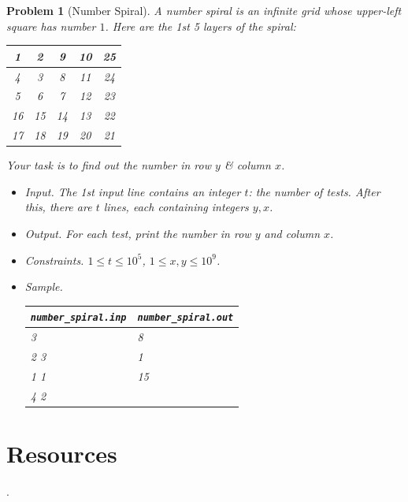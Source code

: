 \documentclass{article}
\newtheorem{problem}{Problem}
\begin{document}
\begin{problem}[Number Spiral]
	A \emph{number spiral} is an infinite grid whose upper-left square has number $1$. Here are the 1st 5 layers of the spiral:
	\begin{table}[H]
		\centering
		\begin{tabular}{|c|c|c|c|c|}
			\hline
			1 & 2 & 9 & 10 & 25 \\
			\hline
			4 & 3 & 8 & 11 & 24 \\
			\hline
			5 & 6 & 7 & 12 & 23 \\
			\hline
			16 & 15 & 14 & 13 & 22 \\
			\hline
			17 & 18 & 19 & 20 & 21 \\
			\hline
		\end{tabular}
	\end{table}
	Your task is to find out the number in row $y$ \& column $x$.
	\begin{itemize}
		\item {\sf Input.} The 1st input line contains an integer $t$: the number of tests. After this, there are $t$ lines, each containing integers $y,x$.
		\item {\sf Output.} For each test, print the number in row $y$ and column $x$.
		\item {\sf Constraints.} $1\le t\le10^5$, $1\le x,y\le10^9$.
		\item {\sf Sample.}
		\begin{table}[H]
			\centering
			\begin{tabular}{|l|l|}
				\hline
				\verb|number_spiral.inp| & \verb|number_spiral.out| \\
				\hline
				3 & 8 \\
				2 3 & 1 \\
				1 1 & 15 \\
				4 2 & \\
				\hline				
			\end{tabular}
		\end{table}
	\end{itemize}
\end{problem}


\section*{Resources}
\cite{TLGK_chuyen_Tin_quyen_1, TLGK_chuyen_Tin_quyen_2, TLGK_chuyen_Tin_quyen_3, Knuth1997, VietSTEM2021, VietSTEM2022}.


\printbibliography[heading=bibintoc]
	
\end{document}
